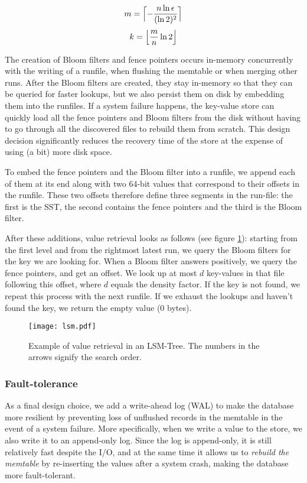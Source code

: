 $$ m = \Bigl\lceil-\frac{n\ln \epsilon}{(\ln 2)^2}\Bigr\rceil $$
$$ k = \Bigl\lfloor \frac{m}{n}\ln 2 \Bigr\rfloor$$

The creation of Bloom filters and fence pointers occurs in-memory concurrently with the writing of a runfile, when flushing the memtable or when merging other runs. After the Bloom filters are created, they stay in-memory so that they can be queried for faster lookups, but we also persist them on disk by embedding them into the runfiles. If a system failure happens, the key-value store can quickly load all the fence pointers and Bloom filters from the disk without having to go through all the discovered files to rebuild them from scratch. This design decision significantly reduces the recovery time of the store at the expense of using (a bit) more disk space.

To embed the fence pointers and the Bloom filter into a runfile, we append each of them at its end along with two 64-bit values that correspond to their offsets in the runfile. These two offsets therefore define three segments in the run-file: the first is the SST, the second contains the fence pointers and the third is the Bloom filter.

After these additions, value retrieval looks as follows (see figure \ref{fig:lsm}): starting from the first level and from the rightmost latest run, we query the Bloom filters for the key we are looking for. When a Bloom filter answers positively, we query the fence pointers, and get an offset. We look up at most $d$ key-values in that file following this offset, where $d$ equals the density factor. If the key is not found, we repeat this process with the next runfile. If we exhaust the lookups and haven't found the key, we return the empty value (0 bytes).

\vspace{20px}
\begin{figure}[h]
    \centering
    \texttt{[image: lsm.pdf]}
    \caption{Example of value retrieval in an LSM-Tree. The numbers in the arrows signify the search order.}
    \label{fig:lsm}
\end{figure}
\vspace{20px}

\subsubsection{Fault-tolerance}

As a final design choice, we add a write-ahead log (WAL) to make the database more resilient by preventing loss of unflushed records in the memtable in the event of a system failure.
More specifically, when we write a value to the store, we also write it to an append-only log. Since the log is append-only, it is still relatively fast despite the I/O, and at the same time it allows us to \textit{rebuild the memtable} by re-inserting the values after a system crash, making the database more fault-tolerant. 

